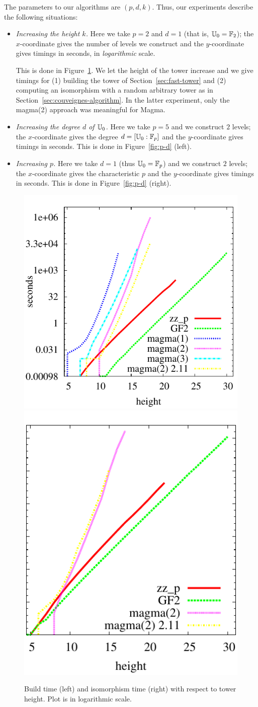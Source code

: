The parameters to our algorithms are $(p,d,k)$. Thus, our experiments
describe the following situations:

\begin{itemize}
\item {\em Increasing the height $k$.} Here we take $p=2$ and $d=1$ (that is,
  $\mathbb{U}_0=\mathbb{F}_2$); the $x$-coordinate gives the number of levels we
  construct and the $y$-coordinate gives timings in seconds, in {\em
    logarithmic} scale.

  This is done in Figure~\ref{fig:height}. We let the height of the
  tower increase and we give timings for (1) building the tower of
  Section~\ref{sec:fast-tower} and (2) computing an isomorphism with a
  random arbitrary tower as in Section~\ref{sec:couveignes-algorithm}.
  In the latter experiment, only the magma(2) approach was meaningful
  for Magma.
\item {\em Increasing the degree $d$ of $\mathbb{U}_0$.} Here we take $p=5$
  and we construct $2$ levels; the $x$-coordinate gives the degree $d
  = [\mathbb{U}_0:\mathbb{F}_p]$ and the $y$-coordinate gives timings in seconds.
  This is done in Figure~\ref{fig:p-d} (left).
\item {\em Increasing $p$.} Here we take $d=1$ (thus $\mathbb{U}_0=\mathbb{F}_p$) and
  we construct $2$ levels; the $x$-coordinate gives the characteristic
  $p$ and the $y$-coordinate gives timings in seconds.  This is done
  in Figure~\ref{fig:p-d} (right).
\end{itemize}



\begin{figure}
  \centering
  \includegraphics[height=0.5\textwidth]{artin/build1}
  \includegraphics[height=0.5\textwidth]{artin/iso1}
  
  \caption{Build time (left) and isomorphism time (right) with respect to tower height. Plot is in logarithmic scale.}
  \label{fig:height}
\end{figure}

